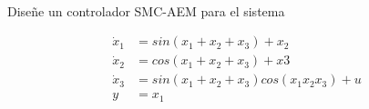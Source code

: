 \begin{flushright}
\end{flushright}

 \paragraph{}  Diseñe un controlador SMC-AEM para el sistema 

\begin{equation*}
    \begin{aligned}
        \dot{x}_1&=sin(x_1+x_2+x_3)+x_2\\
        \dot{x}_2&=cos(x_1+x_2+x_3)+x3\\
        \dot{x}_3&=sin(x_1+x_2+x_3)cos(x_1x_2x_3)+u\\
        y&=x_1\\
    \end{aligned}
\end{equation*}